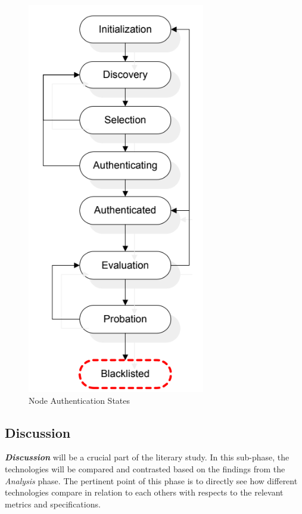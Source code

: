 \begin{figure}[!h]
    \label{uvmodel}
    \centering
    \includegraphics[scale=0.5]{appendices/Node_Authentication_States.png}
    \caption{Node Authentication States \cite{DBLP:conf/mswim/AboudaggaREDQ05}}
\end{figure}

\subsection{Discussion}

\textit{\textbf{Discussion}} will be a crucial part of the literary study. In this sub-phase, the technologies will be compared and contrasted based on the findings from the \textit{Analysis} phase. The pertinent point of this phase is to directly see how different technologies compare in relation to each others with respects to the relevant metrics and specifications.

